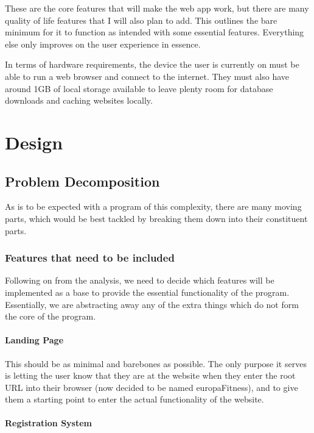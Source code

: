 \documentclass{article}
\begin{document}
These are the core features that will make the web app work, but there are many quality of life features that I will also plan to add. This outlines the bare minimum for it to function as intended with some essential features. Everything else only improves on the user experience in essence. 

In terms of hardware requirements, the device the user is currently on must be able to run a web browser and connect to the internet. They must also have around 1GB of local storage available to leave plenty room for database downloads and caching websites locally.

\section{Design}

\subsection{Problem Decomposition}

As is to be expected with a program of this complexity, there are many moving parts, which would be best tackled by breaking them down into their constituent parts. 

\subsubsection{Features that need to be included}

Following on from the analysis, we need to decide which features will be implemented as a base to provide the essential functionality of the program. Essentially, we are abstracting away any of the extra things which do not form the core of the program. 

\paragraph{Landing Page}

This should be as minimal and barebones as possible. The only purpose it serves is letting the user know that they are at the website when they enter the root URL into their browser (now decided to be named europaFitness), and to give them a starting point to enter the actual functionality of the website. 

\paragraph{Registration System} 
\end{document}
